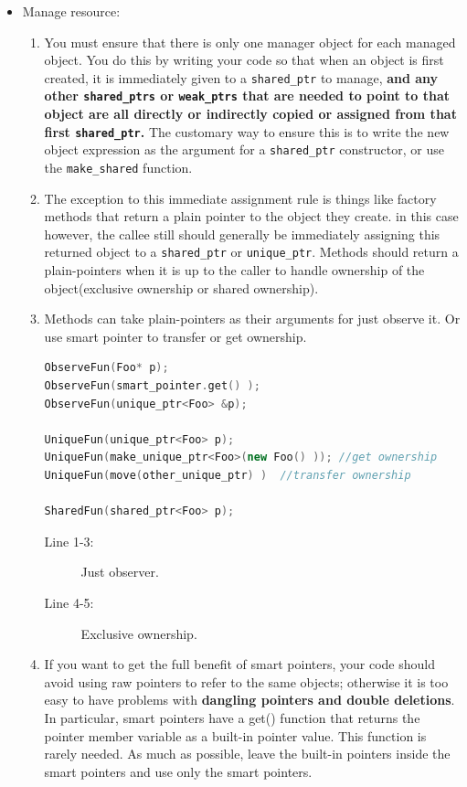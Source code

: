 \documentclass[a4paper,11pt,twoside]{book}
\begin{document}
\begin{itemize}
\item Manage resource:

\begin{enumerate}

\item You must ensure that there is only one manager object for each managed object. You do this by writing your code so that when an object is first created, it is immediately given to a \texttt{shared\_ptr} to manage, \textbf{and any other \texttt{shared\_ptrs} or \texttt{weak\_ptrs} that are needed to point to that object are all directly or indirectly copied or assigned from that first \texttt{shared\_ptr}.} The customary way to ensure this is to write the new object expression as the argument for a \texttt{shared\_ptr} constructor, or use the \texttt{make\_shared} function.

\item The exception to this immediate assignment rule is things like factory methods that return a plain pointer to the object they create. in this case however, the callee still should generally be immediately assigning this returned object to a \texttt{shared\_ptr} or \texttt{unique\_ptr}.  Methods should return a plain-pointers when it is up to the caller to handle ownership of the object(exclusive ownership or shared ownership).


\item Methods can take plain-pointers as their arguments for just observe it. Or use smart pointer to transfer or get ownership.
\begin{lstlisting}[frame=single, language=c++]
ObserveFun(Foo* p);
ObserveFun(smart_pointer.get() );
ObserveFun(unique_ptr<Foo> &p);

UniqueFun(unique_ptr<Foo> p);
UniqueFun(make_unique_ptr<Foo>(new Foo() )); //get ownership
UniqueFun(move(other_unique_ptr) )  //transfer ownership

SharedFun(shared_ptr<Foo> p);
\end{lstlisting}
\begin{description}
	\item[Line 1-3:] Just observer.
	\item[Line 4-5:] Exclusive ownership.
\end{description}

\item If you want to get the full benefit of smart pointers, your code should avoid using raw pointers to refer to the same objects; otherwise it is too easy to have problems with \textbf{dangling pointers and double deletions}. In particular, smart pointers have a get() function that returns the pointer member variable as a built-in pointer value. This function is rarely needed. As much as possible, leave the built-in pointers inside the smart pointers and use only the smart pointers.
\end{enumerate}



\end{itemize}
\end{document}
